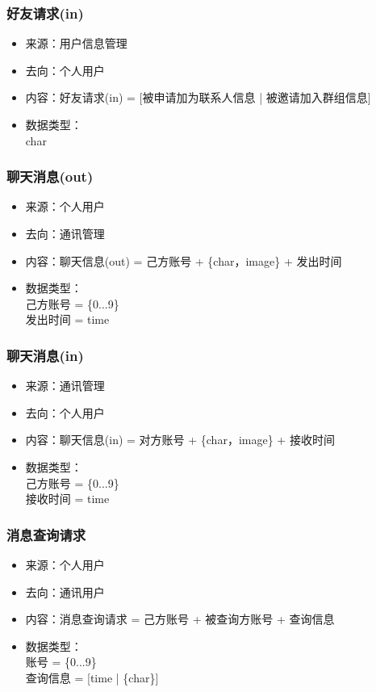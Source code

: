                 \subsubsection{好友请求(in)}
                \begin{itemize}
                    \item 来源：用户信息管理
                    \item 去向：个人用户
                    \item 内容：好友请求(in) = [被申请加为联系人信息 | 被邀请加入群组信息]
                    \item 数据类型：\\{char}
            \end{itemize}
            \subsubsection{聊天消息(out)}
            \begin{itemize}
                \item 来源：个人用户
                \item 去向：通讯管理
                \item 内容：聊天信息(out) = 己方账号 + \{char，image\} + 发出时间
                \item 数据类型：\\己方账号 = \{0...9\}\\
                         发出时间 = time
            \end{itemize}
            \subsubsection{聊天消息(in)}
            \begin{itemize}
                \item 来源：通讯管理
                \item 去向：个人用户
                \item 内容：聊天信息(in) = 对方账号 + \{char，image\} + 接收时间
                \item 数据类型：\\
                己方账号 = \{0...9\}\\
                接收时间 = time\\
            \end{itemize}
            \subsubsection{消息查询请求}
            \begin{itemize}
                \item 来源：个人用户
                \item 去向：通讯用户
                \item 内容：消息查询请求 = 己方账号 + 被查询方账号 + 查询信息
                \item 数据类型：\\
                      账号 = \{0...9\}\\
                      查询信息 = [time | \{char\}]\\
            \end{itemize}
